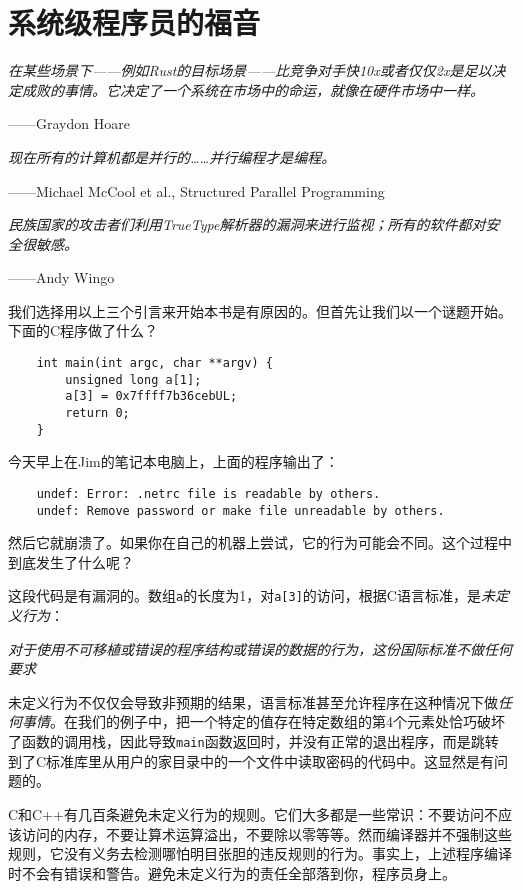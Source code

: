 \chapter{系统级程序员的福音}\label{ch01}
\emph{在某些场景下——例如Rust的目标场景——比竞争对手快10x或者仅仅2x是足以决定成败的事情。它决定了一个系统在市场中的命运，就像在硬件市场中一样。}
\begin{flushright}
    ——Graydon Hoare
\end{flushright}

\emph{现在所有的计算机都是并行的……并行编程才是编程。}
\begin{flushright}
    ——Michael McCool et al., Structured Parallel Programming    
\end{flushright}

\emph{民族国家的攻击者们利用TrueType解析器的漏洞来进行监视；所有的软件都对安全很敏感。}
\begin{flushright}
    ——Andy Wingo
\end{flushright}

我们选择用以上三个引言来开始本书是有原因的。但首先让我们以一个谜题开始。下面的C程序做了什么？
\begin{verbatim}
    int main(int argc, char **argv) {
        unsigned long a[1];
        a[3] = 0x7ffff7b36cebUL;
        return 0;
    }
\end{verbatim}

今天早上在Jim的笔记本电脑上，上面的程序输出了：
\begin{verbatim}
    undef: Error: .netrc file is readable by others.
    undef: Remove password or make file unreadable by others.
\end{verbatim}
然后它就崩溃了。如果你在自己的机器上尝试，它的行为可能会不同。这个过程中到底发生了什么呢？

这段代码是有漏洞的。数组\texttt{a}的长度为1，对\texttt{a[3]}的访问，根据C语言标准，是\emph{未定义行为}：

\emph{对于使用不可移植或错误的程序结构或错误的数据的行为，这份国际标准不做任何要求}

未定义行为不仅仅会导致非预期的结果，语言标准甚至允许程序在这种情况下做\emph{任何事情}。在我们的例子中，把一个特定的值存在特定数组的第4个元素处恰巧破坏了函数的调用栈，因此导致\texttt{main}函数返回时，并没有正常的退出程序，而是跳转到了C标准库里从用户的家目录中的一个文件中读取密码的代码中。这显然是有问题的。

C和C++有几百条避免未定义行为的规则。它们大多都是一些常识：不要访问不应该访问的内存，不要让算术运算溢出，不要除以零等等。然而编译器并不强制这些规则，它没有义务去检测哪怕明目张胆的违反规则的行为。事实上，上述程序编译时不会有错误和警告。避免未定义行为的责任全部落到你，程序员身上。

